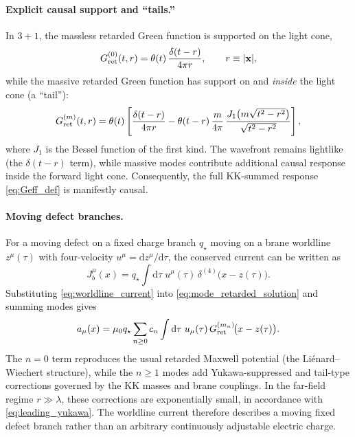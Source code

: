 \documentclass[11pt]{article}
\newcommand{\dd}{\mathrm d}
\newcommand{\J}{J}
\newcommand{\lam}{\lambda}      %
\newcommand{\qstar}{q_\star}
\newcommand{\muo}{\mu_0}
\begin{document}
\paragraph{Explicit causal support and ``tails.''}
In \(3+1\), the massless retarded Green function is supported on the light cone,
\begin{equation}
  G^{(0)}_{\rm ret}(t,r)
  = \theta(t)\,\frac{\delta(t-r)}{4\pi r},
  \qquad r\equiv|\mathbf{x}|,
\end{equation}
while the massive retarded Green function has support on and \emph{inside} the
light cone (a ``tail''):
\begin{equation}
  G^{(m)}_{\rm ret}(t,r)
  = \theta(t)\left[
      \frac{\delta(t-r)}{4\pi r}
      - \theta(t-r)\,\frac{m}{4\pi}\,
        \frac{J_1\!\left(m\sqrt{t^2-r^2}\right)}{\sqrt{t^2-r^2}}
    \right],
  \label{eq:KG_retarded}
\end{equation}
where \(J_1\) is the Bessel function of the first kind. The wavefront remains
lightlike (the \(\delta(t-r)\) term), while massive modes contribute additional
causal response inside the forward light cone. Consequently, the full KK-summed
response \cref{eq:Geff_def} is manifestly causal.

\paragraph{Moving defect branches.}
For a moving defect on a fixed charge branch \(\qstar\) moving on a brane
worldline \(z^\mu(\tau)\) with four-velocity \(u^\mu=\dd z^\mu/\dd\tau\), the
conserved current can be written as
\begin{equation}
  \J_b^\mu(x) = \qstar\int \dd\tau\;u^\mu(\tau)\,\delta^{(4)}\!\big(x-z(\tau)\big).
  \label{eq:worldline_current}
\end{equation}
Substituting \cref{eq:worldline_current} into \cref{eq:mode_retarded_solution} and
summing modes gives
\begin{equation}
  a_\mu(x)
  = \muo \qstar \sum_{n\ge 0} c_n \int \dd\tau\;
    u_\mu(\tau)\,G^{(m_n)}_{\rm ret}\!\big(x-z(\tau)\big).
  \label{eq:worldline_potential}
\end{equation}
The \(n=0\) term reproduces the usual retarded Maxwell potential (the
Liénard--Wiechert structure), while the \(n\ge 1\) modes add Yukawa-suppressed and
tail-type corrections governed by the KK masses and brane couplings. In the
far-field regime \(r\gg \lam\), these corrections are exponentially small, in
accordance with \cref{eq:leading_yukawa}. The worldline current therefore
describes a moving fixed defect branch rather than an arbitrary continuously
adjustable electric charge.
\end{document}
